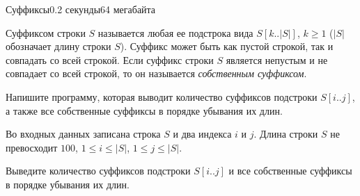 \begin{problem}{Суффиксы}{}{}{0.2 секунды}{64 мегабайта}

Суффиксом строки $S$ называется любая ее подстрока вида $S[k..|S|]$, $k \ge 1$ ($|S|$ обозначает длину строки $S$). 
Суффикс может быть как пустой строкой, так и совпадать со всей строкой.
Если суффикс строки $S$ является непустым и не совпадает со всей строкой, то он называется {\it собственным суффиксом}. 

Напишите программу, которая выводит количество суффиксов подстроки $S[i..j]$, а также 
все собственные суффиксы в порядке убывания их длин.

\InputFile
Во входных данных записана строка $S$ и два индекса $i$ и $j$. Длина строки $S$ не превосходит $100$, $1 \le i \le |S|$, $1 \le j \le |S|$.

\OutputFile
Выведите количество суффиксов подстроки $S[i..j]$
и все собственные суффиксы в порядке убывания их длин.

\Examples

\begin{example}
%
%
\end{example}

\end{problem}

